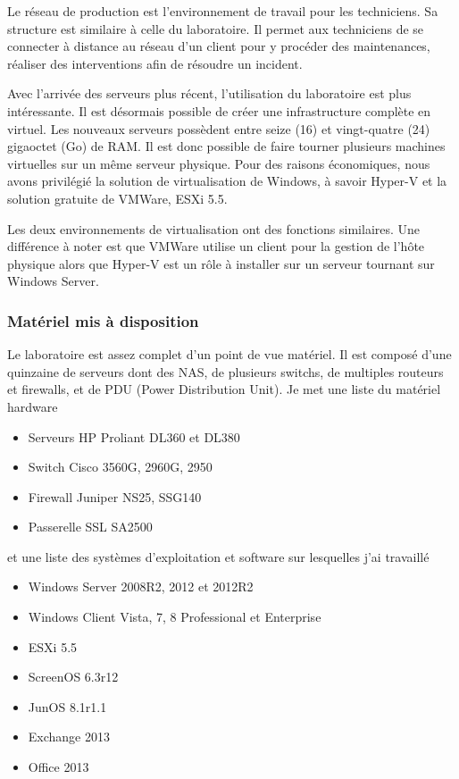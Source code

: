 Le réseau de production est l'environnement de travail pour les techniciens. 
Sa structure est similaire à celle du laboratoire.
Il permet aux techniciens de se connecter à distance au réseau d'un client pour y procéder des maintenances, réaliser des interventions afin de résoudre un incident.

Avec l'arrivée des serveurs plus récent, l'utilisation du laboratoire est plus intéressante.
Il est désormais possible de créer une infrastructure complète en virtuel.
Les nouveaux serveurs possèdent entre seize (16) et vingt-quatre (24) gigaoctet (Go) de RAM.
Il est donc possible de faire tourner plusieurs machines virtuelles sur un même serveur physique.
Pour des raisons économiques, nous avons privilégié la solution de virtualisation de Windows, à savoir Hyper-V et la solution gratuite de VMWare, ESXi 5.5.

Les deux environnements de virtualisation ont des fonctions similaires.
Une différence à noter est que VMWare utilise un client pour la gestion de l'hôte physique alors que Hyper-V est un rôle à installer sur un serveur tournant sur Windows Server.  

\subsubsection{Matériel mis à disposition}
Le laboratoire est assez complet d'un point de vue matériel. 
Il est composé d'une quinzaine de serveurs dont des NAS, de plusieurs switchs, de multiples routeurs et firewalls, et de PDU (Power Distribution Unit).
Je met une liste du matériel hardware
\begin{itemize}
	\item Serveurs HP Proliant DL360 et DL380
	\item Switch Cisco 3560G, 2960G, 2950
	\item Firewall Juniper NS25, SSG140
	\item Passerelle SSL SA2500
\end{itemize}
et une liste des systèmes d'exploitation et software sur lesquelles j'ai travaillé
\begin{itemize}
	\item Windows Server 2008R2, 2012 et 2012R2
	\item Windows Client Vista, 7, 8 Professional et Enterprise
	\item ESXi 5.5
	\item ScreenOS 6.3r12
	\item JunOS 8.1r1.1
	\item Exchange 2013
	\item Office 2013
\end{itemize}


